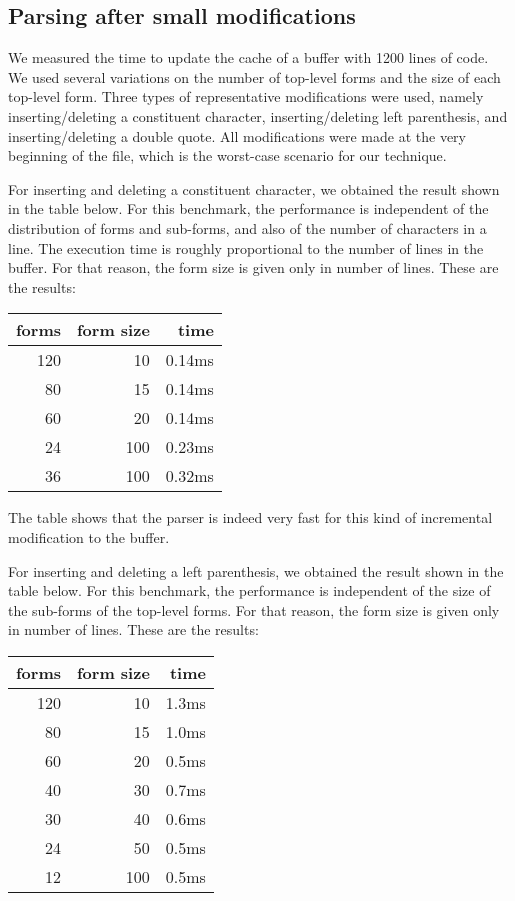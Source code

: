 \subsection{Parsing after small modifications}

We measured the time to update the cache of a buffer with 1200 lines
of \commonlisp{} code.  We used several variations on the number of
top-level forms and the size of each top-level form.  Three types of
representative modifications were used, namely inserting/deleting a
constituent character, inserting/deleting left parenthesis, and
inserting/deleting a double quote.  All modifications were made at the
very beginning of the file, which is the worst-case scenario for our
technique.

For inserting and deleting a constituent character, we obtained the
result shown in the table below.  For this benchmark, the performance
is independent of the distribution of forms and sub-forms, and also of
the number of characters in a line.  The execution time is roughly
proportional to the number of lines in the buffer.  For that reason,
the form size is given only in number of lines.  These are the
results:

\vskip 0.3cm
\begin{tabular}{|r|r|r|}
\hline
forms & form size & time\\
\hline
120 & 10 & 0.14ms\\
80 & 15  & 0.14ms\\
60 & 20  & 0.14ms\\
24 & 100 & 0.23ms\\
36 & 100 & 0.32ms\\
\hline
\end{tabular}
\vskip 0.3cm

\noindent
The table shows that the parser is indeed very fast for this kind of
incremental modification to the buffer.

For inserting and deleting a left parenthesis, we obtained the
result shown in the table below.  For this benchmark, the performance
is independent of the size of the sub-forms of the top-level forms.
For that reason, the form size is given only in number of lines.
These are the results:

\vskip 0.3cm
\begin{tabular}{|r|r|r|}
\hline
forms & form size & time\\
\hline
120 & 10 & 1.3ms\\
80 & 15  & 1.0ms\\
60 & 20  & 0.5ms\\
40 & 30  & 0.7ms\\
30 & 40  & 0.6ms\\
24 & 50  & 0.5ms\\
12 & 100 & 0.5ms\\
\hline
\end{tabular}
\vskip 0.3cm

